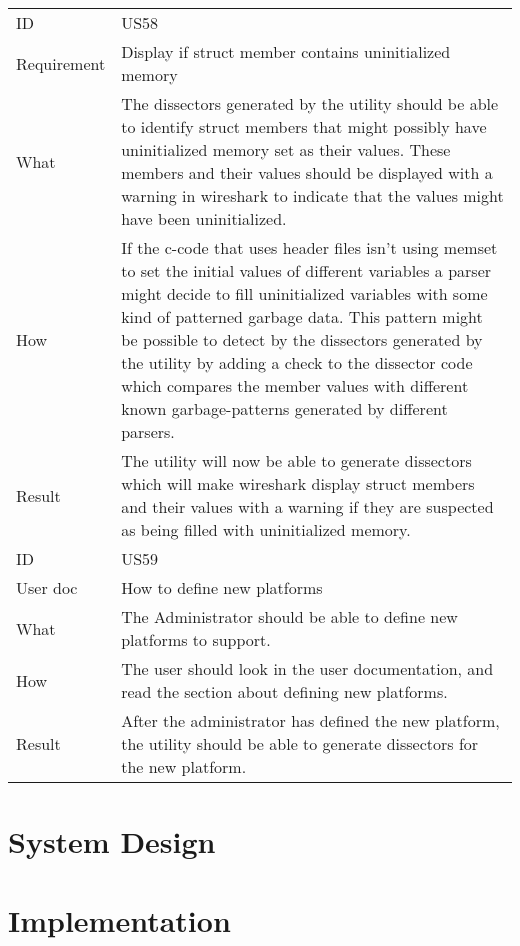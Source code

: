 \begin{table}[htbp]
{\begin{tabularx}{1.2\textwidth}{l X}
	\midrule
	ID & US58 \\
	Requirement & Display if \gls{struct} \gls{member} contains uninitialized memory \\
	What & The \glspl{dissector} generated by the \gls{utility} should be able to identify \gls{struct} \glspl{member} that might possibly have uninitialized memory set as their values.
 	These \glspl{member} and their values should be displayed with a warning in \Gls{wireshark} to indicate that the values might have been uninitialized.  \\
	How & If the \Gls{c}-code that uses \gls{header} files isn’t using memset to set the initial values of different variables a \gls{parser} might decide to fill uninitialized variables with some kind of patterned garbage data.
 	This pattern might be possible to detect by the \glspl{dissector} generated by the \gls{utility} by adding a check to the \gls{dissector} code which compares the \gls{member} values with different known garbage-patterns generated by different \glspl{parser}. \\
	Result & The \gls{utility} will now be able to generate \glspl{dissector} which will make \Gls{wireshark} display \gls{struct} \glspl{member} and their values with a warning if they are suspected as being filled with uninitialized memory. \\	
	\midrule
	ID & US59 \\
	User doc & How to define new platforms \\
	What & The Administrator should be able to define new platforms to support.  \\
	How & The user should look in the user documentation, and read the section about defining new platforms. \\
	Result & After the administrator has defined the new platform, the \gls{utility} should be able to generate \glspl{dissector} for the new platform. \\	
	\bottomrule
\end{tabularx}}
\end{table}

\section{System Design}


\section{Implementation}

